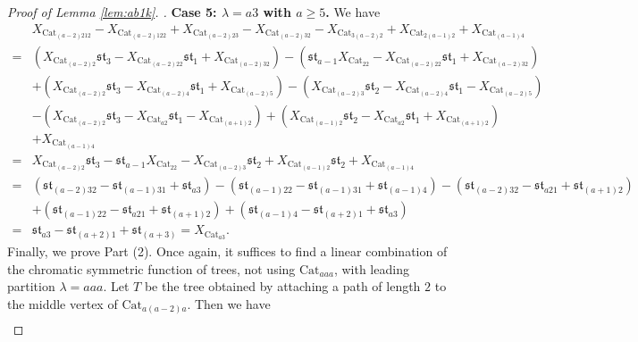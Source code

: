 \documentclass[12pt]{amsart}  %
\theoremstyle{definition}
\theoremstyle{remark}
\numberwithin{equation}{section}
\begin{document}
\begin{proof}[Proof of Lemma \ref{lem:ab1k}. ]
\textbf{Case 5: $\lambda=a3$ with $a\geq 5$. } We have
\begin{align*}
&X_{\text{Cat}_{(a-2)212}}-X_{\text{Cat}_{(a-2)122}}+X_{\text{Cat}_{(a-2)23}}-X_{\text{Cat}_{(a-2)32}}-X_{\text{Cat}_{3(a-2)2}}+X_{\text{Cat}_{2(a-1)2}}+X_{\text{Cat}_{(a-1)4}}\\=&(X_{\text{Cat}_{(a-2)2}}\mathfrak{st}_3-X_{\text{Cat}_{(a-2)22}}\mathfrak{st}_1+X_{\text{Cat}_{(a-2)32}})-(\mathfrak{st}_{a-1}X_{\text{Cat}_{22}}-X_{\text{Cat}_{(a-2)22}}\mathfrak{st}_1+X_{\text{Cat}_{(a-2)32}})\\&+(X_{\text{Cat}_{(a-2)2}}\mathfrak{st}_3-X_{\text{Cat}_{(a-2)4}}\mathfrak{st}_1+X_{\text{Cat}_{(a-2)5}})-(X_{\text{Cat}_{(a-2)3}}\mathfrak{st}_2-X_{\text{Cat}_{(a-2)4}}\mathfrak{st}_1-X_{\text{Cat}_{(a-2)5}})\\&-(X_{\text{Cat}_{(a-2)2}}\mathfrak{st}_3-X_{\text{Cat}_{a2}}\mathfrak{st}_1-X_{\text{Cat}_{(a+1)2}})+(X_{\text{Cat}_{(a-1)2}}\mathfrak{st}_2-X_{\text{Cat}_{a2}}\mathfrak{st}_1+X_{\text{Cat}_{(a+1)2}})\\&+X_{\text{Cat}_{(a-1)4}}\\=&X_{\text{Cat}_{(a-2)2}}\mathfrak{st}_3-\mathfrak{st}_{a-1}X_{\text{Cat}_{22}}-X_{\text{Cat}_{(a-2)3}}\mathfrak{st}_2+X_{\text{Cat}_{(a-1)2}}\mathfrak{st}_2+X_{\text{Cat}_{(a-1)4}}\\=&(\mathfrak{st}_{(a-2)32}-\mathfrak{st}_{(a-1)31}+\mathfrak{st}_{a3})-(\mathfrak{st}_{(a-1)22}-\mathfrak{st}_{(a-1)31}+\mathfrak{st}_{(a-1)4})-(\mathfrak{st}_{(a-2)32}-\mathfrak{st}_{a21}+\mathfrak{st}_{(a+1)2})\\&+(\mathfrak{st}_{(a-1)22}-\mathfrak{st}_{a21}+\mathfrak{st}_{(a+1)2})+(\mathfrak{st}_{(a-1)4}-\mathfrak{st}_{(a+2)1}+\mathfrak{st}_{a3})\\=&\mathfrak{st}_{a3}-\mathfrak{st}_{(a+2)1}+\mathfrak{st}_{(a+3)}=X_{\text{Cat}_{a3}}.
\end{align*}
Finally, we prove Part (2). Once again, it suffices to find a linear combination of the chromatic symmetric function of trees, not using $\text{Cat}_{aaa}$, with leading partition $\lambda=aaa$. Let $T$ be the tree obtained by attaching a path of length $2$ to the middle vertex of $\text{Cat}_{a(a-2)a}$. Then we have
\begin{align*}

\end{align*}
\end{proof}
\end{document}
